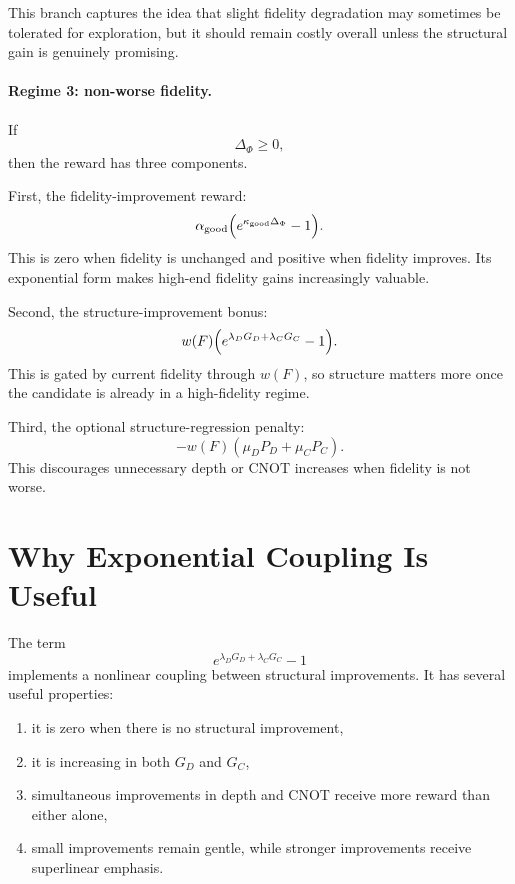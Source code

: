 \documentclass[11pt]{article}
\begin{document}
This branch captures the idea that slight fidelity degradation may sometimes be tolerated for exploration, but it should remain costly overall unless the structural gain is genuinely promising.

\paragraph{Regime 3: non-worse fidelity.}
If
\begin{equation}
    \Delta_{\Phi}\ge 0,
\end{equation}
then the reward has three components.

First, the fidelity-improvement reward:
\begin{equation}
    \alpha_{\mathrm{good}}\Bigl(e^{\kappa_{\mathrm{good}}\Delta_{\Phi}}-1\Bigr).
\end{equation}
This is zero when fidelity is unchanged and positive when fidelity improves. Its exponential form makes high-end fidelity gains increasingly valuable.

Second, the structure-improvement bonus:
\begin{equation}
    w(F)\Bigl(e^{\lambda_D G_D+\lambda_C G_C}-1\Bigr).
\end{equation}
This is gated by current fidelity through $w(F)$, so structure matters more once the candidate is already in a high-fidelity regime.

Third, the optional structure-regression penalty:
\begin{equation}
    -w(F)(\mu_D P_D + \mu_C P_C).
\end{equation}
This discourages unnecessary depth or CNOT increases when fidelity is not worse.

\section{Why Exponential Coupling Is Useful}

The term
\begin{equation}
    e^{\lambda_D G_D+\lambda_C G_C}-1
\end{equation}
implements a nonlinear coupling between structural improvements.
It has several useful properties:
\begin{enumerate}[label=(\arabic*)]
    \item it is zero when there is no structural improvement,
    \item it is increasing in both $G_D$ and $G_C$,
    \item simultaneous improvements in depth and CNOT receive more reward than either alone,
    \item small improvements remain gentle, while stronger improvements receive superlinear emphasis.
\end{enumerate}
\end{document}
